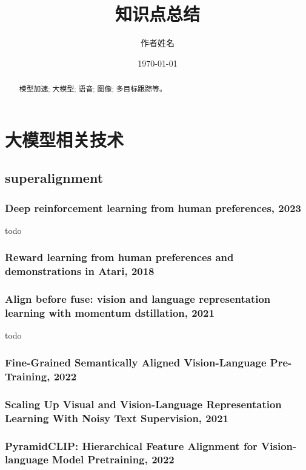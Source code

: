 \documentclass[twocolumn, 10pt]{article} %
\begin{document}
\title{知识点总结}
\author{作者姓名}
\date{\today}
\maketitle
\begin{abstract}
    模型加速; 大模型; 语音; 图像; 多目标跟踪等。
\end{abstract}


\section{大模型相关技术}
\subsection{superalignment}
\subsubsection{Deep reinforcement learning from human preferences,  2023}
todo

\subsubsection{Reward learning from human preferences and demonstrations in Atari, 2018}


\subsubsection{Align before fuse: vision and language representation learning with momentum dstillation, 2021}
todo

\subsubsection{Fine-Grained Semantically Aligned Vision-Language Pre-Training, 2022}


\subsubsection{Scaling Up Visual and Vision-Language Representation Learning With Noisy Text Supervision, 2021}

\subsubsection{PyramidCLIP: Hierarchical Feature Alignment for Vision-language Model Pretraining, 2022}
\end{document}
